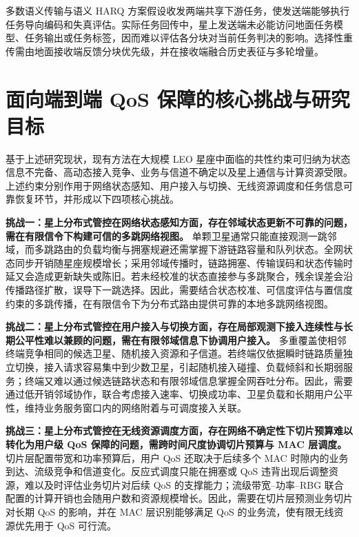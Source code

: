 多数语义传输与语义 HARQ 方案假设收发两端共享下游任务，使发送端能够执行任务导向编码和失真评估\cite{Shao-TaskOrientedCommunication-JSAC2022}。实际任务回传中，星上发送端未必能访问地面任务模型、任务输出或任务标签\cite{zhang-TaskUnawareSemanticCommunication-JSAC2023}，因而难以评估各分块对当前任务判决的影响。选择性重传需由地面接收端反馈分块优先级，并在接收端融合历史表征与多轮增量。

\section{面向端到端 QoS 保障的核心挑战与研究目标}

基于上述研究现状，现有方法在大规模 LEO 星座中面临的共性约束可归纳为状态信息不完备、高动态接入竞争、业务与信道不确定以及星上通信与计算资源受限。上述约束分别作用于网络状态感知、用户接入与切换、无线资源调度和任务信息可靠恢复环节，并形成以下四项核心挑战。

\textbf{挑战一：星上分布式管控在网络状态感知方面，存在邻域状态更新不可靠的问题，需在有限信令下构建可信的多跳网络视图。} 单颗卫星通常只能直接观测一跳邻域，而多跳路由的负载均衡与拥塞规避还需掌握下游链路容量和队列状态。全网状态同步开销随星座规模增长；采用邻域传播时，链路拥塞、传输误码和状态传输时延又会造成更新缺失或陈旧。若未经校准的状态直接参与多跳聚合，残余误差会沿传播路径扩散，误导下一跳选择。因此，需要结合状态校准、可信度评估与置信度约束的多跳传播，在有限信令下为分布式路由提供可靠的本地多跳网络视图。

\textbf{挑战二：星上分布式管控在用户接入与切换方面，存在局部观测下接入连续性与长期公平性难以兼顾的问题，需在有限邻域信息下协调用户接入。} 多重覆盖使相邻终端竞争相同的候选卫星、随机接入资源和子信道。若终端仅依据瞬时链路质量独立切换，接入请求容易集中到少数卫星，引起随机接入碰撞、负载倾斜和长期弱服务；终端又难以通过候选链路状态和有限邻域信息掌握全网吞吐分布。因此，需要通过低开销邻域协作，联合考虑接入速率、切换成功率、卫星负载和长期用户公平性，维持业务服务窗口内的网络附着与可调度接入关联。

\textbf{挑战三：星上分布式管控在无线资源调度方面，存在网络不确定性下切片预算难以转化为用户级 QoS 保障的问题，需跨时间尺度协调切片预算与 MAC 层调度。} 切片层配置带宽和功率预算后，用户 QoS 还取决于后续多个 MAC 时隙内的业务到达、流级竞争和信道变化。反应式调度只能在拥塞或 QoS 违背出现后调整资源，难以及时评估业务切片对后续 QoS 的支撑能力；流级带宽--功率--RBG 联合配置的计算开销也会随用户数和资源规模增长。因此，需要在切片层预测业务切片对长期 QoS 的影响，并在 MAC 层识别能够满足 QoS 的业务流，使有限无线资源优先用于 QoS 可行流。

